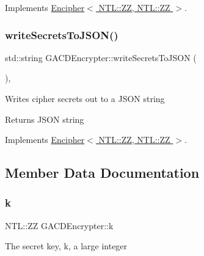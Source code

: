 Implements \hyperlink{classEncipher_aaf8138eb280608bfd03c6eb762ffc010}{Encipher$<$ N\+T\+L\+::\+Z\+Z, N\+T\+L\+::\+Z\+Z $>$}.

\mbox{\label{classGACDEncrypter_a01cd18ae81d0d28076c4ceb690a8b418}} 
\subsubsection{\texorpdfstring{write\+Secrets\+To\+J\+S\+O\+N()}{writeSecretsToJSON()}}
{\footnotesize\ttfamily std\+::string G\+A\+C\+D\+Encrypter\+::write\+Secrets\+To\+J\+S\+ON (\begin{DoxyParamCaption}{ }\end{DoxyParamCaption})\hspace{0.3cm}{\ttfamily [override]}, {\ttfamily [virtual]}}

Writes cipher secrets out to a J\+S\+ON string \begin{DoxyReturn}{Returns}
J\+S\+ON string 
\end{DoxyReturn}


Implements \hyperlink{classEncipher_a27d3efa1e364c1f0d7def65454c61b85}{Encipher$<$ N\+T\+L\+::\+Z\+Z, N\+T\+L\+::\+Z\+Z $>$}.



\subsection{Member Data Documentation}
\mbox{\label{classGACDEncrypter_af235b4e988a563f05d29b461c88f8703}} 
\subsubsection{\texorpdfstring{k}{k}}
{\footnotesize\ttfamily N\+T\+L\+::\+ZZ G\+A\+C\+D\+Encrypter\+::k\hspace{0.3cm}{\ttfamily [private]}}

The secret key, {\ttfamily k}, a large integer \mbox{\label{classGACDEncrypter_a646b9daae82d6666d6a8affd3de41fd5}} 

